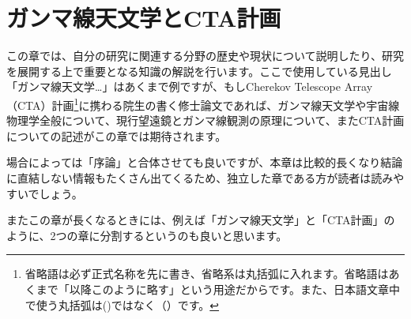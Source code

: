 \chapter{ガンマ線天文学とCTA計画}
\label{chap_review}

この章では、自分の研究に関連する分野の歴史や現状について説明したり、研究を展開する上で重要となる知識の解説を行います。ここで使用している見出し「ガンマ線天文学…」はあくまで例ですが、もしCherekov Telescope Array（CTA）計画\footnote{省略語は必ず正式名称を先に書き、省略系は丸括弧に入れます。省略語はあくまで「以降このように略す」という用途だからです。また、日本語文章中で使う丸括弧は()ではなく（）です。}に携わる院生の書く修士論文であれば、ガンマ線天文学や宇宙線物理学全般について、現行望遠鏡とガンマ線観測の原理について、またCTA計画についての記述がこの章では期待されます。

場合によっては「序論」と合体させても良いですが、本章は比較的長くなり結論に直結しない情報もたくさん出てくるため、独立した章である方が読者は読みやすいでしょう。

またこの章が長くなるときには、例えば「ガンマ線天文学」と「CTA計画」のように、2つの章に分割するというのも良いと思います。
